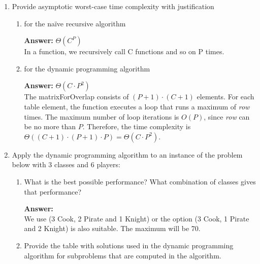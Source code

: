 \documentclass[dvipsnames]{article}
\begin{document}
\begin{enumerate}
\begin{enumerate}
\begin{verbatim}
    matrixForOverlap[row][column] = max
    return matrixForOverlap[row][column]
\end{verbatim}
        \color{black}
      \end{enumerate}
  
    \item Provide asymptotic worst-case time complexity with justification
        \begin{enumerate}
          \item for the na\"ive recursive algorithm

          \color{blue}
          \textbf{Answer:} $\Theta(C^P)$ \\
          In a function, we recursively call C functions and so on P times.\\
          \color{black}

          \item for the dynamic programming algorithm

          \color{blue}
         \textbf{Answer:} $\Theta(C \cdot P^2)$ \\
        The matrixForOverlap consists of $(P+1) \cdot (C+1)$ elements. For each table element, the function executes a loop that runs a maximum of \textit{row} times. The maximum number of loop iterations is $O(P)$, since \textit{row} can be no more than $P$. Therefore, the time complexity is $\Theta((C+1) \cdot (P+1)\cdot P) = \Theta(C \cdot P^2)$.\\
          
          \color{black}
        \end{enumerate}

    \item Apply the dynamic programming algorithm to an instance of the problem below with 3 classes and 6 players:
    \begin{enumerate}
      \item What is the best possible performance? What combination of classes gives that performance?

      \color{blue}
      \textbf{Answer:}\\
      We use (3 Cook, 2 Pirate and 1 Knight) or the option (3 Cook, 1 Pirate and 2 Knight) is also suitable. The maximum will be 70.
      \color{black}

      \item Provide the table with solutions used in the dynamic programming algorithm for subproblems that are computed in the algorithm.
  

\end{enumerate}
\end{enumerate}
\end{document}
